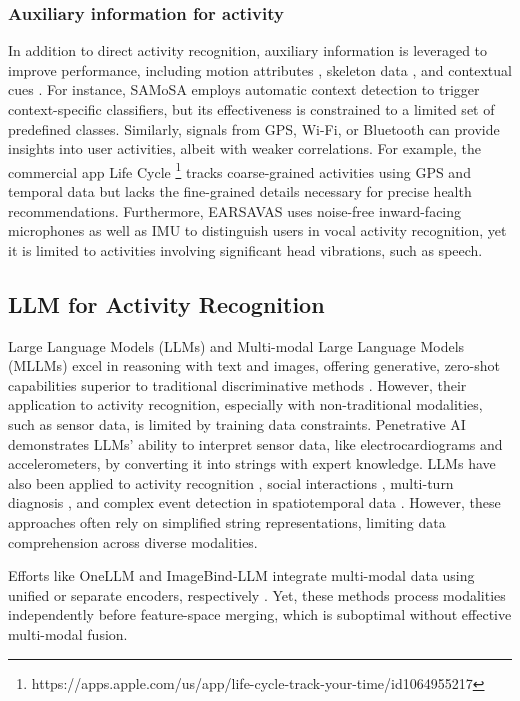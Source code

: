 \subsubsection{Auxiliary information for activity}
In addition to direct activity recognition, auxiliary information is leveraged to improve performance, including motion attributes \cite{tong2021zero}, skeleton data \cite{zhu2023motionbert}, and contextual cues \cite{mollyn2022samosa}. For instance, SAMoSA \cite{mollyn2022samosa} employs automatic context detection to trigger context-specific classifiers, but its effectiveness is constrained to a limited set of predefined classes. Similarly, signals from GPS, Wi-Fi, or Bluetooth \cite{xu2024penetrative} can provide insights into user activities, albeit with weaker correlations. For example, the commercial app Life Cycle \footnote{https://apps.apple.com/us/app/life-cycle-track-your-time/id1064955217} tracks coarse-grained activities using GPS and temporal data but lacks the fine-grained details necessary for precise health recommendations. Furthermore, EARSAVAS \cite{zhang2024earsavas} uses noise-free inward-facing microphones as well as IMU to distinguish users in vocal activity recognition, yet it is limited to activities involving significant head vibrations, such as speech.

\subsection{LLM for Activity Recognition}
Large Language Models (LLMs) and Multi-modal Large Language Models (MLLMs) excel in reasoning with text and images, offering generative, zero-shot capabilities superior to traditional discriminative methods \cite{yang2024viassist, liu2023improved}. However, their application to activity recognition, especially with non-traditional modalities, such as sensor data, is limited by training data constraints. Penetrative AI \cite{xu2024penetrative} demonstrates LLMs' ability to interpret sensor data, like electrocardiograms and accelerometers, by converting it into strings with expert knowledge. LLMs have also been applied to activity recognition \cite{ji2024hargpt, leng2024imugpt}, social interactions \cite{yang2024socialmind}, multi-turn diagnosis \cite{yang2024drhouse}, and complex event detection in spatiotemporal data \cite{ouyang2024llmsense}. However, these approaches often rely on simplified string representations, limiting data comprehension across diverse modalities.

Efforts like OneLLM and ImageBind-LLM integrate multi-modal data using unified or separate encoders, respectively \cite{han2023onellm, zhang2023llamaadapter}. Yet, these methods process modalities independently before feature-space merging, which is suboptimal without effective multi-modal fusion.



